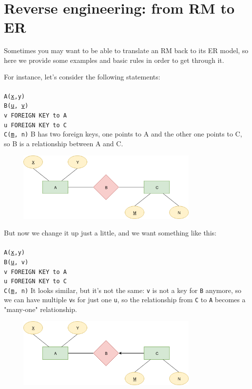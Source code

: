 \documentclass[class=book, crop=false, oneside]{standalone}
\newcommand\tab[1][1cm]{\hspace*{#1}}
\begin{document}
\section{Reverse engineering: from RM to ER}
Sometimes you may want to be able to translate an RM back to its ER model, so here we provide some examples and basic rules in order to get through it.

For instance, let's consider the following statements:\\\\
\texttt{A(\underline{x},y)}\\
\texttt{B(\underline{u}, \underline{v})}\\
\tab[.2cm] \texttt{v FOREIGN KEY to A}\\
\tab[.2cm] \texttt{u FOREIGN KEY to C}\\
\texttt{C(\underline{m}, n)}
\vskip 5pt
B has two foreign keys, one points to A and the other one points to C, so B is a relationship between A and C.
\begin{figure}[H]
	\includegraphics[width=0.8\textwidth,keepaspectratio]{diagram3_00.png}
	\caption{}
	\label{diagram3_00}
\end{figure}
\vskip 5pt
But now we change it up just a little, and we want something like this:\\\\
\texttt{A(\underline{x},y)}\\
\texttt{B(\underline{u}, v)}\\
\tab[.2cm] \texttt{v FOREIGN KEY to A}\\
\tab[.2cm] \texttt{u FOREIGN KEY to C}\\
\texttt{C(\underline{m}, n)}
\vskip 5pt
It looks similar, but it's not the same: \texttt{v} is not a key for \texttt{B} anymore, so we can have multiple \texttt{v}s for just one \texttt{u}, so the relationship from \texttt{C} to \texttt{A} becomes a "many-one" relationship.
\begin{figure}[H]
	\includegraphics[width=0.8\textwidth,keepaspectratio]{diagram3_01.png}
	\caption{}
	\label{diagram3_01}
\end{figure}
\end{document}
